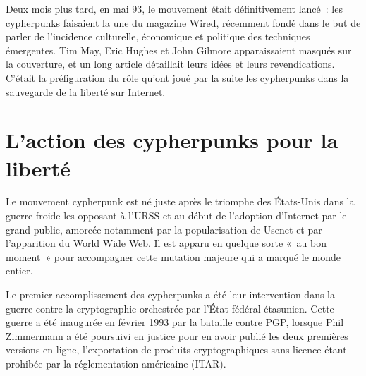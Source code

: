 Deux mois plus tard, en mai 93, le mouvement était définitivement lancé~: les cypherpunks faisaient la une du magazine Wired, récemment fondé dans le but de parler de l'incidence culturelle, économique et politique des techniques émergentes. Tim May, Eric Hughes et John Gilmore apparaissaient masqués sur la couverture, et un long article détaillait leurs idées et leurs revendications. C'était la préfiguration du rôle qu'ont joué par la suite les cypherpunks dans la sauvegarde de la liberté sur Internet. %

\section*{L'action des cypherpunks pour la liberté} %

Le mouvement cypherpunk est né juste après le triomphe des États-Unis dans la guerre froide les opposant à l'URSS et au début de l'adoption d'Internet par le grand public, amorcée notamment par la popularisation de Usenet et par l'apparition du World Wide Web. Il est apparu en quelque sorte «~au bon moment~» pour accompagner cette mutation majeure qui a marqué le monde entier.


Le premier accomplissement des cypherpunks a été leur intervention dans la guerre contre la cryptographie orchestrée par l'État fédéral étasunien. Cette guerre a été inaugurée en février 1993 par la bataille contre PGP, lorsque Phil Zimmermann a été poursuivi en justice pour en avoir publié les deux premières versions en ligne, l'exportation de produits cryptographiques sans licence étant prohibée par la réglementation américaine (ITAR).

%


